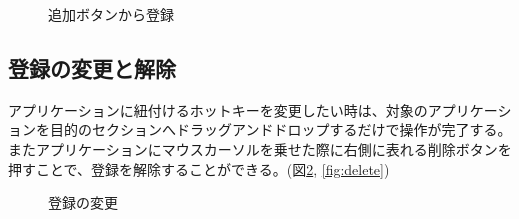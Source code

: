 \begin{figure}[h]
    \begin{center}
    \end{center}
    \caption{追加ボタンから登録}
    \label{fig:add2}
\end{figure}

\subsection{登録の変更と解除}
アプリケーションに紐付けるホットキーを変更したい時は、対象のアプリケーションを目的のセクションへドラッグアンドドロップするだけで操作が完了する。またアプリケーションにマウスカーソルを乗せた際に右側に表れる削除ボタンを押すことで、登録を解除することができる。(図\ref{fig:change}, \ref{fig:delete})

\begin{figure}[h]
    \begin{center}
    \end{center}
    \caption{登録の変更}
    \label{fig:change}
\end{figure}

